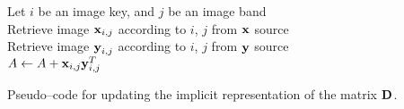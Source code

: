 \vspace{0.4cm}
\begin{algorithm}[H]
    \SetAlgoLined
         {
            Let $i$ be an image key, and $j$ be an image band \\
            Retrieve image $\boldsymbol{\mathbf{x}}_{i,j}$ according to $i$, $j$ from $\boldsymbol{\mathbf{x}}$ source \\
            Retrieve image $\boldsymbol{\mathbf{y}}_{i,j}$ according to $i$, $j$ from $\boldsymbol{\mathbf{y}}$ source \\
            $A \gets A + \boldsymbol{\mathbf{x}}_{i,j}\boldsymbol{\mathbf{y}}_{i,j}^T$ \\
        }
    \caption{Pseudo--code for updating the implicit representation of the matrix $\boldsymbol{\mathbf{D}}$.}
    \label{pscode:update-d:implicit}
\end{algorithm}
\vspace{0.4cm}